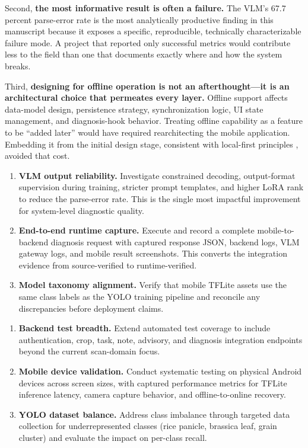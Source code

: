 Second, \textbf{the most informative result is often a failure.} The VLM's 67.7 percent
parse-error rate is the most analytically productive finding in this manuscript because it
exposes a specific, reproducible, technically characterizable failure mode. A project that
reported only successful metrics would contribute less to the field than one that documents
exactly where and how the system breaks.

Third, \textbf{designing for offline operation is not an afterthought---it is an architectural
choice that permeates every layer.} Offline support affects data-model design, persistence
strategy, synchronization logic, UI state management, and diagnosis-hook behavior. Treating
offline capability as a feature to be ``added later'' would have required rearchitecting the
mobile application. Embedding it from the initial design stage, consistent with local-first
principles \parencite{kleppmannLocalFirst2019}, avoided that cost.



\begin{enumerate}[label=\arabic*.]
\item \textbf{VLM output reliability.} Investigate constrained decoding, output-format
supervision during training, stricter prompt templates, and higher LoRA rank to reduce the
parse-error rate. This is the single most impactful improvement for system-level diagnostic
quality.

\item \textbf{End-to-end runtime capture.} Execute and record a complete mobile-to-backend
diagnosis request with captured response JSON, backend logs, VLM gateway logs, and mobile
result screenshots. This converts the integration evidence from source-verified to
runtime-verified.

\item \textbf{Model taxonomy alignment.} Verify that mobile TFLite assets use the same
class labels as the YOLO training pipeline and reconcile any discrepancies before deployment
claims.
\end{enumerate}


\begin{enumerate}[label=\arabic*.]
\item \textbf{Backend test breadth.} Extend automated test coverage to include authentication,
crop, task, note, advisory, and diagnosis integration endpoints beyond the current scan-domain
focus.

\item \textbf{Mobile device validation.} Conduct systematic testing on physical Android devices
across screen sizes, with captured performance metrics for TFLite inference latency, camera
capture behavior, and offline-to-online recovery.

\item \textbf{YOLO dataset balance.} Address class imbalance through targeted data collection
for underrepresented classes (rice panicle, brassica leaf, grain cluster) and evaluate the
impact on per-class recall.
\end{enumerate}

